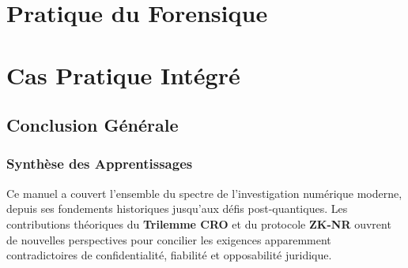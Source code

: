 \documentclass[11pt,a4paper,oneside]{book}
\begin{document}
        \part{Pratique du Forensique}
        
        
        
        
        

        \part{Cas Pratique Intégré}
        

    \chapter*{Conclusion Générale}

        \section*{Synthèse des Apprentissages}
        Ce manuel a couvert l'ensemble du spectre de l'investigation numérique moderne, depuis ses fondements historiques jusqu'aux défis post-quantiques. Les contributions théoriques du \textbf{Trilemme CRO} et du protocole \textbf{ZK-NR} ouvrent de nouvelles perspectives pour concilier les exigences apparemment contradictoires de confidentialité, fiabilité et opposabilité juridique.
\end{document}
